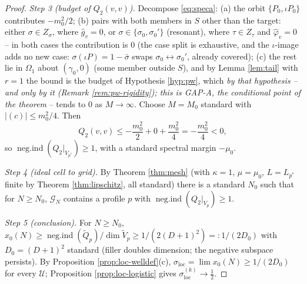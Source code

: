 \documentclass[11pt,reqno]{amsart}
\theoremstyle{definition}
\newcommand{\negind}{\operatorname{neg.ind}}
\newcommand{\half}{\tfrac12}
\begin{document}
\begin{proof}
\emph{Step 3 (budget of \(Q_2(v,v)\)).} Decompose \eqref{eq:speca}: (a) the orbit
\(\{P_0,\iota P_0\}\) contributes \(-m_0^2/2\); (b) pairs with both members in
\(S\) other than the target: either \(\sigma\in Z_\sigma\), where
\(\hat g_v=0\), or \(\sigma\in\{\sigma_0,\sigma_0'\}\) (resonant), where
\(\tau\in Z_\tau\) and \(\hat\varphi_v=0\) -- in both cases the contribution is
\(0\) (the case split is exhaustive, and the \(\iota\)-image adds no new case:
\(\sigma(\iota P)=1-\bar\sigma\) swaps \(\sigma_0\leftrightarrow\sigma_0'\),
already covered); (c) the rest lie in \(\Omega_1\) about \((\gamma_0,0)\) (some
member outside \(S\)), and by Lemma \ref{lem:tail} with \(r=1\) the bound is
the budget of Hypothesis \ref{hyp:pw}, which \emph{by that hypothesis -- and
only by it (Remark \ref{rem:pw-rigidity}); this is GAP-A, the conditional point
of the theorem} -- tends to \(0\) as \(M\to\infty\). Choose \(M=M_0\) standard
with \(|(c)|\leq m_0^2/4\). Then
\[
Q_2(v,v)\leq-\frac{m_0^2}{2}+0+\frac{m_0^2}{4}=-\frac{m_0^2}{4}<0,
\]
so \(\negind(Q_2|_{V_{p^*}})\geq1\), with a standard spectral margin \(-\mu_0\).

\emph{Step 4 (ideal cell to grid).} By Theorem \ref{thm:mesh} (with
\(\kappa=1\), \(\mu=\mu_0\), \(L=L_{p^*}\) finite by Theorem \ref{thm:lipschitz},
all standard) there is a standard \(N_0\) such that for \(N\geq N_0\),
\(\mathcal G_N\) contains a profile \(p\) with \(\negind(Q_2|_{V_p})\geq1\).

\emph{Step 5 (conclusion).} For \(N\geq N_0\),
\(x_0(N)\geq\negind(\tilde Q_p)/\dim\tilde V_p\geq1/(2(D+1)^2)=:1/(2D_0)\) with
\(D_0=(D+1)^2\) standard (filler doubles dimension; the negative subspace
persists).
By Proposition \ref{prop:loc-welldef}(c),
\(\sigma_{\mathrm{loc}}=\lim x_0(N)\geq1/(2D_0)\) for every \(\mathcal U\);
Proposition \ref{prop:loc-logistic} gives \(\sigma_{\mathrm{loc}}^{(k)}\to\half\).
\end{proof}
\end{document}

